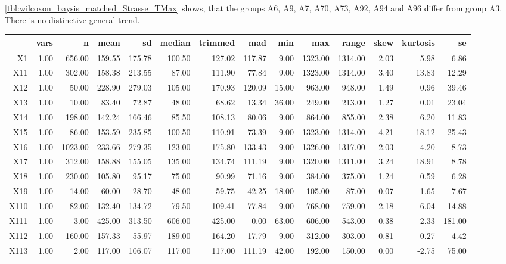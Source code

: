 \cref{tbl:wilcoxon_baysis_matched_Strasse_TMax} shows, that the groups A6, A9, A7, A70, A73, A92, A94 and A96 differ from group A3. There is no distinctive general trend.
\begin{table}[ht!]
	\tiny
	\centering
  \begin{tabular}{rrrrrrrrrrrrrr}
    \hline
   & vars & n & mean & sd & median & trimmed & mad & min & max & range & skew & kurtosis & se \\ 
    \hline
  X1 & 1.00 & 656.00 & 159.55 & 175.78 & 100.50 & 127.02 & 117.87 & 9.00 & 1323.00 & 1314.00 & 2.03 & 5.98 & 6.86 \\ 
    X11 & 1.00 & 302.00 & 158.38 & 213.55 & 87.00 & 111.90 & 77.84 & 9.00 & 1323.00 & 1314.00 & 3.40 & 13.83 & 12.29 \\ 
    X12 & 1.00 & 50.00 & 228.90 & 279.03 & 105.00 & 170.93 & 120.09 & 15.00 & 963.00 & 948.00 & 1.49 & 0.96 & 39.46 \\ 
    X13 & 1.00 & 10.00 & 83.40 & 72.87 & 48.00 & 68.62 & 13.34 & 36.00 & 249.00 & 213.00 & 1.27 & 0.01 & 23.04 \\ 
    X14 & 1.00 & 198.00 & 142.24 & 166.46 & 85.50 & 108.13 & 80.06 & 9.00 & 864.00 & 855.00 & 2.38 & 6.20 & 11.83 \\ 
    X15 & 1.00 & 86.00 & 153.59 & 235.85 & 100.50 & 110.91 & 73.39 & 9.00 & 1323.00 & 1314.00 & 4.21 & 18.12 & 25.43 \\ 
    X16 & 1.00 & 1023.00 & 233.66 & 279.35 & 123.00 & 175.80 & 133.43 & 9.00 & 1326.00 & 1317.00 & 2.03 & 4.20 & 8.73 \\ 
    X17 & 1.00 & 312.00 & 158.88 & 155.05 & 135.00 & 134.74 & 111.19 & 9.00 & 1320.00 & 1311.00 & 3.24 & 18.91 & 8.78 \\ 
    X18 & 1.00 & 230.00 & 105.80 & 95.17 & 75.00 & 90.99 & 71.16 & 9.00 & 384.00 & 375.00 & 1.24 & 0.59 & 6.28 \\ 
    X19 & 1.00 & 14.00 & 60.00 & 28.70 & 48.00 & 59.75 & 42.25 & 18.00 & 105.00 & 87.00 & 0.07 & -1.65 & 7.67 \\ 
    X110 & 1.00 & 82.00 & 132.40 & 134.72 & 79.50 & 109.41 & 77.84 & 9.00 & 768.00 & 759.00 & 2.18 & 6.04 & 14.88 \\ 
    X111 & 1.00 & 3.00 & 425.00 & 313.50 & 606.00 & 425.00 & 0.00 & 63.00 & 606.00 & 543.00 & -0.38 & -2.33 & 181.00 \\ 
    X112 & 1.00 & 160.00 & 157.33 & 55.97 & 189.00 & 164.20 & 17.79 & 9.00 & 312.00 & 303.00 & -0.81 & 0.27 & 4.42 \\ 
    X113 & 1.00 & 2.00 & 117.00 & 106.07 & 117.00 & 117.00 & 111.19 & 42.00 & 192.00 & 150.00 & 0.00 & -2.75 & 75.00 \\ 

\end{tabular}
\end{table}
